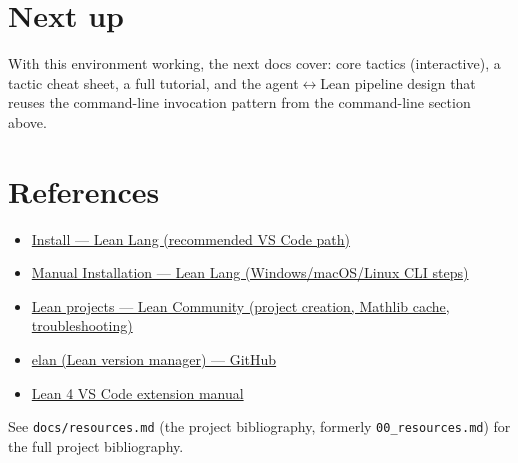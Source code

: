 \section{Next up}

With this environment working, the next docs cover: core tactics (interactive), a tactic cheat sheet, a full tutorial, and the agent\(\leftrightarrow\)Lean pipeline design that reuses the command-line invocation pattern from the command-line section above.

\section{References}

\begin{itemize}
  \item \href{https://lean-lang.org/install/}{Install --- Lean Lang (recommended VS Code path)}
  \item \href{https://lean-lang.org/install/manual/}{Manual Installation --- Lean Lang (Windows/macOS/Linux CLI steps)}
  \item \href{https://leanprover-community.github.io/install/project.html}{Lean projects --- Lean Community (project creation, Mathlib cache, troubleshooting)}
  \item \href{https://github.com/leanprover/elan}{elan (Lean version manager) --- GitHub}
  \item \href{https://github.com/leanprover/vscode-lean4/blob/master/vscode-lean4/manual/manual.md}{Lean 4 VS Code extension manual}
\end{itemize}

See \texttt{docs/resources.md} (the project bibliography, formerly \texttt{00\_resources.md}) for the full project bibliography.
